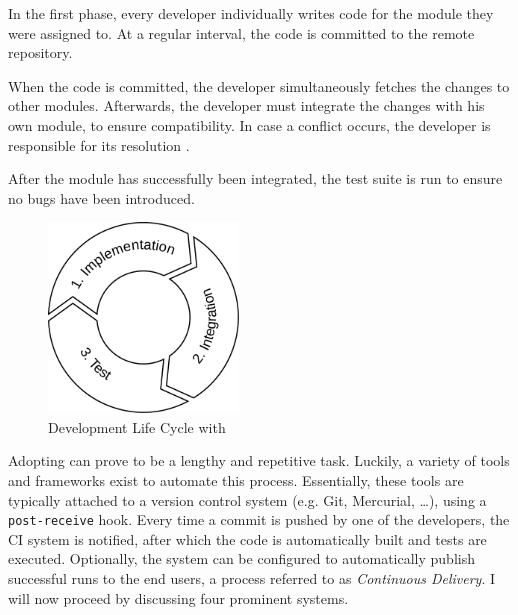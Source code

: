 \begin{enumerate}
	 In the first phase, every developer individually writes code for the module they were assigned to. At a regular interval, the code is committed to the remote repository.
	
	 When the code is committed, the developer simultaneously fetches the changes to other modules. Afterwards, the developer must integrate the changes with his own module, to ensure compatibility. In case a conflict occurs, the developer is responsible for its resolution \cite{martin2014}.
	
	 After the module has successfully been integrated, the test suite is run to ensure no bugs have been introduced.
\end{enumerate}

\begin{figure}[htbp!]
	\centering
	\includegraphics[width=0.45\textwidth]{assets/ci-lifecycle.pdf}
	\caption{Development Life Cycle with \CI{}}
	\label{fig:agile-ci-lifecycle}
\end{figure}

\noindent Adopting \CI{} can prove to be a lengthy and repetitive task. Luckily, a variety of tools and frameworks exist to automate this process. Essentially, these tools are typically attached to a version control system (e.g. Git, Mercurial, \dots), using a \texttt{post-receive} hook. Every time a commit is pushed by one of the developers, the CI system is notified, after which the code is automatically built and tests are executed. Optionally, the system can be configured to automatically publish successful runs to the end users, a process referred to as \emph{Continuous Delivery}. I will now proceed by discussing four prominent \CI{} systems.




